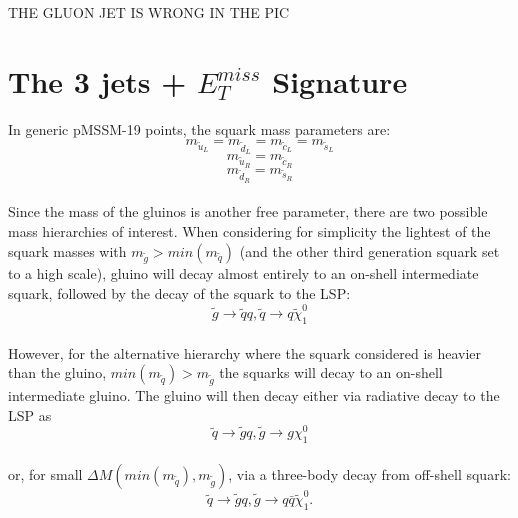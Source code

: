 \documentclass[epj,nopacs,fleqn]{svjour}
\begin{document}
THE GLUON JET IS WRONG IN THE PIC


\section{The 3 jets + $E_T ^{miss}$ Signature }\label{sec::T3GQ}
In generic pMSSM-19 points, the squark mass parameters are: 
\begin{equation*}
m_{\tilde u_L} = m_{\tilde d_L} = m_{\tilde c_L} = m_{\tilde s_L} 
\end{equation*}
\begin{equation*}
m_{\tilde u_R} = m_{\tilde c_R} 
\end{equation*}
\begin{equation*}
m_{\tilde d_R} = m_{\tilde s_R}
\end{equation*}
\\
Since the mass of the gluinos is another free parameter, there are two possible mass hierarchies of interest. 
When considering for simplicity the lightest of the squark masses with $m_{\tilde g} > min(m_{\tilde q})$ (and the other third generation squark set to a high scale), gluino will decay almost entirely to an on-shell intermediate squark, followed by the decay of the squark to the LSP:
\begin{equation}\label{decay_TGQ}
\tilde g \rightarrow \tilde q q , \tilde q \rightarrow q \tilde \chi_1 ^0
\end{equation}
\\
However, for the alternative hierarchy where the squark considered is heavier than the gluino,  $ min(m_{\tilde q}) > m_{\tilde g}$ the squarks will decay to an on-shell intermediate gluino. The gluino will then decay either via radiative decay to the LSP as 
\begin{equation}\label{decay_TQG}
\tilde q \rightarrow \tilde g q , \tilde g \rightarrow g \chi_1 ^0
\end{equation} 
\\
or, for small $\Delta M(min(m_{\tilde q}), m_{\tilde g})$,  via a three-body decay from off-shell squark:
\begin{equation}
\tilde q \rightarrow \tilde g q, \tilde g \rightarrow q \bar q \tilde \chi _1 ^0.
 \end{equation}
\\
\end{document}
